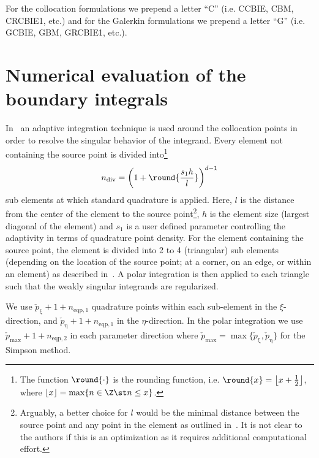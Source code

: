For the collocation formulations we prepend a letter ``C'' (i.e. CCBIE, CBM, CRCBIE1, etc.) and for the Galerkin formulations we prepend a letter ``G'' (i.e. GCBIE, GBM, GRCBIE1, etc.).

\section{Numerical evaluation of the boundary integrals}
\label{Sec3:numericalQuad}
In~\cite[p. 286]{Simpson2014aib} an adaptive integration technique is used around the collocation points in order to resolve the singular behavior of the integrand. Every element not containing the source point is divided into\footnote{The function $\round{\cdot}$ is the rounding function, i.e. $\round{x} = \left\lfloor x+\frac{1}{2}\right\rfloor$, where $\lfloor x\rfloor = \max\{n\in\Z\st n\leq x\}$.}
\begin{equation}\label{Eq3:numberOfSubElements}
	n_{\mathrm{div}} = \left(1+\round{\frac{s_1 h}{l}}\right)^{d-1}
\end{equation}
sub elements at which standard quadrature is applied. Here, $l$ is the distance from the center of the element to the source point\footnote{Arguably, a better choice for $l$ would be the minimal distance between the source point and any point in the element as outlined in~\cite{Taus2015iaf}. It is not clear to the authors if this is an optimization as it requires additional computational effort.}, $h$ is the element size (largest diagonal of the element) and $s_1$ is a user defined parameter controlling the adaptivity in terms of quadrature point density. For the element containing the source point, the element is divided into 2 to 4 (triangular) sub elements (depending on the location of the source point; at a corner, on an edge, or within an element) as described in~\cite{Scott2013ibe}. A polar integration is then applied to each triangle such that the weakly singular integrands are regularized.

We use $\check{p}_\upxi+1+n_{\mathrm{eqp},1}$ quadrature points within each sub-element in the $\xi$-direction, and $\check{p}_\upeta+1+n_{\mathrm{eqp},1}$ in the $\eta$-direction. In the polar integration we use $\check{p}_{\mathrm{max}}+1+n_{\mathrm{eqp},2}$ in each parameter direction where $\check{p}_{\mathrm{max}} = \max\{\check{p}_\upxi,\check{p}_\upeta\}$ for the Simpson method.

